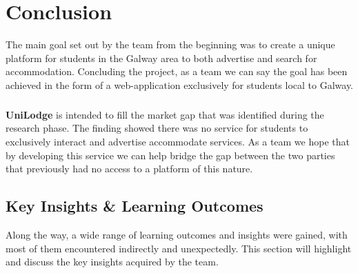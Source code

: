 \chapter{Conclusion}
The main goal set out by the team from the beginning was to create a unique platform for students in the Galway area to both advertise and search for accommodation. Concluding the project, as a team we can say the goal has been achieved in the form of a web-application exclusively for students local to Galway. 

\paragraph{}
\textbf{UniLodge} is intended to fill the market gap that was identified during the research phase. The finding showed there was no service for students to exclusively interact and advertise accommodate services. As a team we hope that by developing this service we can help bridge the gap between the two parties that previously had no access to a platform of this nature.

\section{Key Insights \& Learning Outcomes}
Along the way, a wide range of learning outcomes and insights were gained, with most of them encountered indirectly and unexpectedly. This section will highlight and discuss the key insights acquired by the team.

